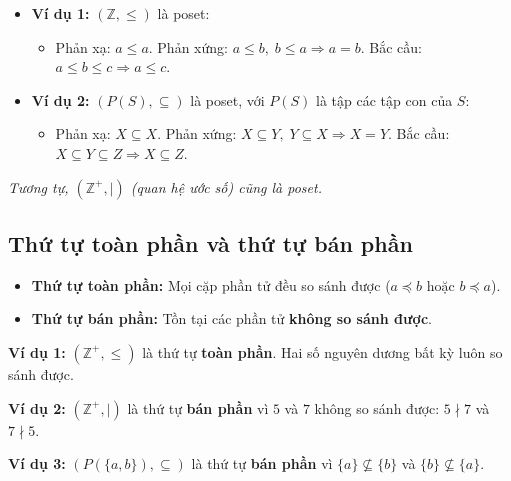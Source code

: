 \documentclass[12pt,a4paper]{article}
\begin{document}
\begin{itemize}
  \item \textbf{\textcolor{AccentRed}{Ví dụ 1:}} $(\mathbb{Z}, \le)$ là poset:
  \begin{itemize}
    \item Phản xạ: $a \le a$. \quad Phản xứng: $a \le b,\; b \le a \Rightarrow a = b$. \quad Bắc cầu: $a \le b \le c \Rightarrow a \le c$.
  \end{itemize}
  \item \textbf{\textcolor{AccentRed}{Ví dụ 2:}} $(P(S), \subseteq)$ là poset, với $P(S)$ là tập các tập con của $S$:
  \begin{itemize}
    \item Phản xạ: $X \subseteq X$. \quad Phản xứng: $X \subseteq Y,\; Y \subseteq X \Rightarrow X = Y$. \quad Bắc cầu: $X \subseteq Y \subseteq Z \Rightarrow X \subseteq Z$.
  \end{itemize}
\end{itemize}
\textit{Tương tự, $(\mathbb{Z}^+, \mid)$ (quan hệ ước số) cũng là poset.}

\subsection{Thứ tự toàn phần và thứ tự bán phần}

\begin{itemize}
  \item \textbf{Thứ tự toàn phần:} Mọi cặp phần tử đều so sánh được ($a \preceq b$ hoặc $b \preceq a$).
  \item \textbf{Thứ tự bán phần:} Tồn tại các phần tử \textbf{không so sánh được}.
\end{itemize}

\noindent
\begin{minipage}[t]{0.50\textwidth}
\textbf{\textcolor{AccentRed}{Ví dụ 1:}} $(\mathbb{Z}^+, \le)$ là thứ tự \textbf{toàn phần}. Hai số nguyên dương bất kỳ luôn so sánh được.

\vspace{6pt}
\textbf{\textcolor{AccentRed}{Ví dụ 2:}} $(\mathbb{Z}^+, \mid)$ là thứ tự \textbf{bán phần} vì $5$ và $7$ không so sánh được: $5 \nmid 7$ và $7 \nmid 5$.
\end{minipage}
\hfill
\begin{minipage}[t]{0.46\textwidth}
\textbf{\textcolor{AccentRed}{Ví dụ 3:}} $(P(\{a, b\}), \subseteq)$ là thứ tự \textbf{bán phần} vì $\{a\} \not\subseteq \{b\}$ và $\{b\} \not\subseteq \{a\}$.
\begin{center}
\end{center}
\end{minipage}
\end{document}
